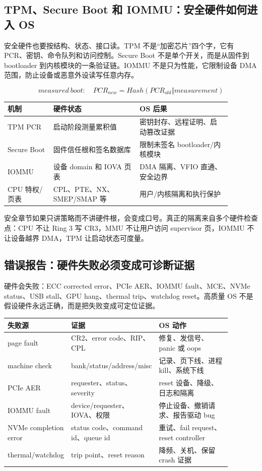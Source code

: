 \subsection{TPM、Secure Boot 和 IOMMU：安全硬件如何进入 OS}

安全硬件也要按结构、状态、接口读。TPM 不是“加密芯片”四个字，它有 PCR、密钥、命令队列和访问控制。Secure Boot 不是单个开关，而是从固件到 bootloader 到内核模块的一条验证链。IOMMU 不是只为性能，它限制设备 DMA 范围，防止设备或恶意外设读写任意内存。

\[
measured\ boot:\quad
PCR_{new}=Hash(PCR_{old}\Vert measurement)
\]

\begin{longtable}{p{0.18\linewidth}p{0.34\linewidth}p{0.36\linewidth}}
\toprule
机制 & 硬件状态 & OS 后果 \\
\midrule
TPM PCR & 启动阶段测量累积值 & 密钥封存、远程证明、启动篡改证据 \\
Secure Boot & 固件信任根和签名数据库 & 限制未签名 bootloader/内核模块 \\
IOMMU & 设备 domain 和 IOVA 页表 & DMA 隔离、VFIO 直通、安全边界 \\
CPU 特权/页表 & CPL、PTE、NX、SMEP/SMAP 等 & 用户/内核隔离和执行保护 \\
\bottomrule
\end{longtable}

安全章节如果只讲策略而不讲硬件根，会变成口号。真正的隔离来自多个硬件检查点：CPU 不让 Ring 3 写 CR3，MMU 不让用户访问 supervisor 页，IOMMU 不让设备越界 DMA，TPM 让启动状态可度量。

\subsection{错误报告：硬件失败必须变成可诊断证据}

硬件会失败：ECC corrected error、PCIe AER、IOMMU fault、MCE、NVMe status、USB stall、GPU hang、thermal trip、watchdog reset。高质量 OS 不是假设硬件永远正确，而是把失败变成可定位证据。

\begin{longtable}{p{0.20\linewidth}p{0.34\linewidth}p{0.34\linewidth}}
\toprule
失败源 & 证据 & OS 动作 \\
\midrule
page fault & CR2、error code、RIP、CPL & 修复、发信号、panic 或 oops \\
machine check & bank/status/address/misc & 记录、页下线、进程 kill、系统下线 \\
PCIe AER & requester、status、severity & reset 设备、降级、日志和隔离 \\
IOMMU fault & device/requester、IOVA、权限 & 停止设备、撤销请求、报告驱动 bug \\
NVMe completion error & status code、command id、queue id & 重试、fail request、reset controller \\
thermal/watchdog & trip point、reset reason & 降频、关机、保留 crash 证据 \\
\bottomrule
\end{longtable}

